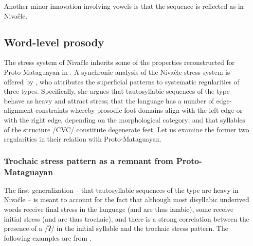 \begin{exe}
    \ex \arrive
    \ex \cryao
    \ex \returnth
    \ex \burn
    \ex \shoulderblade
    \ex \spring
\end{exe}

Another minor innovation involving vowels is that the sequence  is reflected as  in Nivaĉle.

\begin{exe}
    \ex \wildmanioc
    \ex \river
\end{exe}

\subsection{Word-level prosody}\label{ni-prosody}

The stress system of Nivaĉle inherits some of the properties reconstructed for Proto-Mataguayan in . A synchronic analysis of the Nivaĉle stress system is offered by \citet{AnG15}, who attributes the superficial patterns to systematic regularities of three types. Specifically, she argues that tautosyllabic sequences of the type  behave as heavy and attract stress; that the language has a number of edge-alignment constraints whereby prosodic foot domains align with the left edge or with the right edge, depending on the morphological category; and that syllables of the structure /CVC/ constitute degenerate feet. Let us examine the former two regularities in their relation with Proto-Mataguayan.

\subsubsection{Trochaic stress pattern as a remnant from Proto-Mataguayan}\label{ni-trochee}

The first generalization -- that tautosyllabic sequences of the type  are heavy in Nivaĉle -- is meant to account for the fact that although most disyllabic underived words receive final stress in the language (and are thus iambic), some receive initial stress (and are thus trochaic), and there is a strong correlation between the presence of a /ʔ/ in the initial syllable and the trochaic stress pattern. The following examples are from \citet[162–163, 168]{AnG15}.

\ea\label{ex:stress:1:niv}
    \begin{xlist}
        \ex {}
        \ex {}
        \ex {}
        \ex {}
        \ex {}
        \ex {}
        \ex {}
        \ex {}
        \ex {}
        \ex {}
    \end{xlist}
\z
{}

